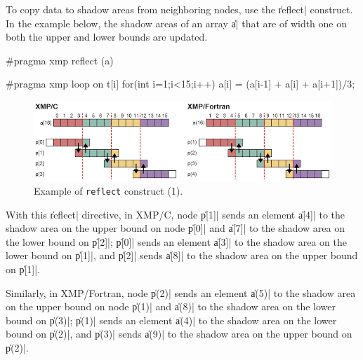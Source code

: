 
To copy data to shadow areas from neighboring nodes, use the \|reflect|
construct. In the example below, the shadow areas of an array \|a| that
are of width one on both the upper and lower bounds are updated.

\begin{XCexample}
#pragma xmp reflect (a)

#pragma xmp loop on t[i]
for(int i=1;i<15;i++)
  a[i] = (a[i-1] + a[i] + a[i+1])/3;
\end{XCexample}


\begin{figure}
  \centering
  \includegraphics[width=\textwidth]{figs/reflect.png}
  \caption{Example of {\tt reflect} construct (1).}
\end{figure}

With this \|reflect| directive, in XMP/C, node \|p[1]| sends an element
\|a[4]| to the shadow area on the upper bound on node \|p[0]| and
\|a[7]| to the shadow area on the lower bound on \|p[2]|; \|p[0]| sends
an element \|a[3]| to the shadow area on the lower bound on \|p[1]|, and
\|p[2]| sends \|a[8]| to the shadow area on the upper bound on \|p[1]|.

Similarly, in XMP/Fortran, node \|p(2)| sends an element \|a(5)| to the
shadow area on the upper bound on node \|p(1)| and \|a(8)| to the shadow
area on the lower bound on \|p(3)|; \|p(1)| sends an element \|a(4)| to
the shadow area on the lower bound on \|p(2)|, and \|p(3)| sends \|a(9)|
to the shadow area on the upper bound on \|p(2)|.


